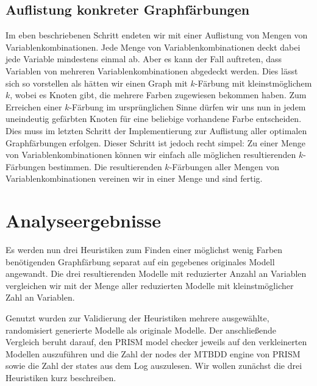 \documentclass[a4paper]{article}
\theoremstyle{nonumberplain}
\begin{document}
\subsection{Auflistung konkreter Graphfärbungen}

Im eben beschriebenen Schritt endeten wir mit einer Auflistung von Mengen von Variablenkombinationen. Jede Menge von Variablenkombinationen deckt dabei jede Variable mindestens einmal ab. Aber es kann der Fall auftreten, dass Variablen von mehreren Variablenkombinationen abgedeckt werden. Dies lässt sich so vorstellen als hätten wir einen Graph mit $k$-Färbung mit kleinstmöglichem $k$, wobei es Knoten gibt, die mehrere Farben zugewiesen bekommen haben. Zum Erreichen einer $k$-Färbung im ursprünglichen Sinne dürfen wir uns nun in jedem uneindeutig gefärbten Knoten für eine beliebige vorhandene Farbe entscheiden. Dies muss im letzten Schritt der Implementierung zur Auflistung aller optimalen Graphfärbungen erfolgen. Dieser Schritt ist jedoch recht simpel:
Zu einer Menge von Variablenkombinationen können wir einfach alle möglichen resultierenden $k$-Färbungen bestimmen. Die resultierenden $k$-Färbungen aller Mengen von Variablenkombinationen vereinen wir in einer Menge und sind fertig.


\section{Analyseergebnisse}

\newcommand{\mmfh}{MaxMer}
\newcommand{\wph}{WelPow}
\newcommand{\rnh}{RemNod}

Es werden nun drei Heuristiken zum Finden einer möglichst wenig Farben benötigenden Graphfärbung separat auf ein gegebenes originales Modell angewandt.
Die drei resultierenden Modelle mit reduzierter Anzahl an Variablen vergleichen wir mit der Menge aller reduzierten Modelle mit kleinstmöglicher Zahl an Variablen.

Genutzt wurden zur Validierung der Heuristiken mehrere ausgewählte, randomisiert generierte Modelle als originale Modelle. Der anschließende Vergleich beruht darauf, den PRISM model checker jeweils auf den verkleinerten Modellen auszuführen und die Zahl der nodes der MTBDD engine von PRISM sowie die Zahl der states aus dem Log auszulesen.
Wir wollen zunächst die drei Heuristiken kurz beschreiben.
\end{document}
